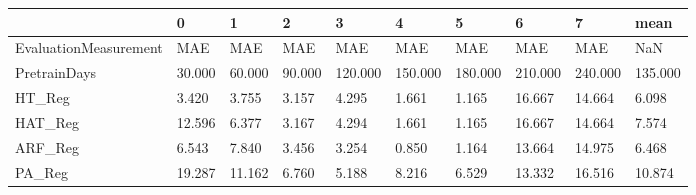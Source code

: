 \begin{tabular}{llllllllll}
\toprule
{} &      0 &      1 &      2 &       3 &       4 &       5 &       6 &       7 &    mean \\
\midrule
EvaluationMeasurement &    MAE &    MAE &    MAE &     MAE &     MAE &     MAE &     MAE &     MAE &     NaN \\
PretrainDays          & 30.000 & 60.000 & 90.000 & 120.000 & 150.000 & 180.000 & 210.000 & 240.000 & 135.000 \\
HT\_Reg                &  3.420 &  3.755 &  3.157 &   4.295 &   1.661 &   1.165 &  16.667 &  14.664 &   6.098 \\
HAT\_Reg               & 12.596 &  6.377 &  3.167 &   4.294 &   1.661 &   1.165 &  16.667 &  14.664 &   7.574 \\
ARF\_Reg               &  6.543 &  7.840 &  3.456 &   3.254 &   0.850 &   1.164 &  13.664 &  14.975 &   6.468 \\
PA\_Reg                & 19.287 & 11.162 &  6.760 &   5.188 &   8.216 &   6.529 &  13.332 &  16.516 &  10.874 \\
\bottomrule
\end{tabular}
